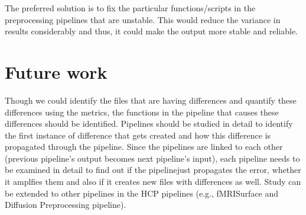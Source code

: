 The preferred solution is to fix the particular functions/scripts in the preprocessing pipelines that are unstable. This would reduce the variance in results considerably and thus, it could make the output more stable and reliable.

\section{Future work}
Though we could identify the files that are having differences and quantify these differences using the metrics, the functions in the pipeline that causes these differences should be identified.
Pipelines should be studied in detail to identify the first instance of difference that gets created and how this difference is propagated through the pipeline.
Since the pipelines are linked to each other (previous pipeline's output becomes next pipeline's input), each pipeline needs to be examined in detail to find out if the pipelinejust propagates the error, whether it amplfies them and also if it creates new files with differences as well. 
Study can be extended to other pipelines in the HCP pipelines (e.g., fMRISurface and Diffusion Preprocessing pipeline).
